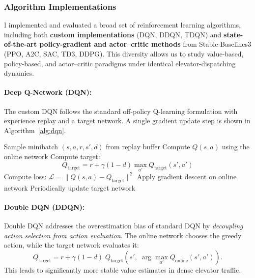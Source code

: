 \documentclass[10pt,twocolumn]{article}
\begin{document}
\subsubsection{Algorithm Implementations}

I implemented and evaluated a broad set of reinforcement learning algorithms, including both \textbf{custom implementations} (DQN, DDQN, TDQN) and \textbf{state-of-the-art policy-gradient and actor--critic methods} from Stable-Baselines3 (PPO, A2C, SAC, TD3, DDPG). This diversity allows us to study value-based, policy-based, and actor--critic paradigms under identical elevator-dispatching dynamics.

\vspace{0.5em}

\paragraph*{Deep Q-Network (DQN):}
The custom DQN follows the standard off-policy Q-learning formulation with experience replay and a target network. A single gradient update step is shown in Algorithm~\ref{alg:dqn}.

\begin{algorithm}[H]
\caption{DQN Training Step}
\label{alg:dqn}
\begin{algorithmic}[1]
\State Sample minibatch $(s,a,r,s',d)$ from replay buffer
\State Compute $Q(s,a)$ using the online network
\State Compute target:
\[
Q_{\text{target}} = r + \gamma (1-d)\max_{a'} Q_{\text{target}}(s',a')
\]
\State Compute loss: $\mathcal{L} = \|Q(s,a) - Q_{\text{target}}\|^2$
\State Apply gradient descent on online network
\State Periodically update target network
\end{algorithmic}
\end{algorithm}

\vspace{0.5em}

\paragraph*{Double DQN (DDQN):}
Double DQN addresses the overestimation bias of standard DQN by 
\textit{decoupling action selection from action evaluation}. 
The online network chooses the greedy action, while the target network evaluates it:
\[
Q_{\text{target}} 
= r + \gamma(1-d)\;
Q_{\text{target}}\!\left(s',\;
\arg\max_{a'} Q_{\text{online}}(s',a')\right).
\]
This leads to significantly more stable value estimates in dense elevator traffic.
\end{document}
